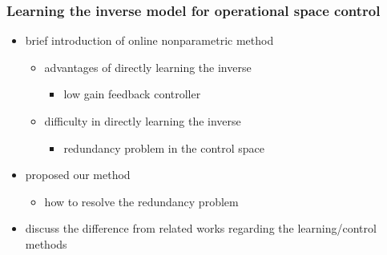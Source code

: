\documentclass[journal,onecolumn]{IEEEtran}
\begin{document}
\subsubsection{Learning the inverse model for operational space control}
\label{sec:org5e8356b}
\begin{itemize}
\item brief introduction of online nonparametric method
\begin{itemize}
\item advantages of directly learning the inverse
\begin{itemize}
\item low gain feedback controller
\end{itemize}
\item difficulty in directly learning the inverse
\begin{itemize}
\item redundancy problem in the control space
\end{itemize}
\end{itemize}
\item proposed our method
\begin{itemize}
\item how to resolve the redundancy problem
\end{itemize}
\item discuss the difference from related works regarding the learning/control methods
\end{itemize}
\end{document}
